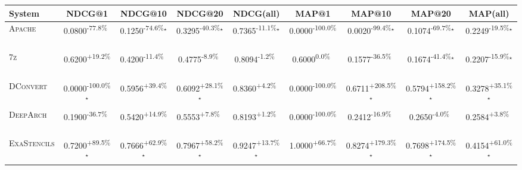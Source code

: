 \begin{table}[htbp]
\centering
\renewcommand{\arraystretch}{1.2}
\begin{tabular}{l|cccc|cccc}
\hline
System & NDCG@1 & NDCG@10 & NDCG@20 & NDCG(all) & MAP@1 & MAP@10 & MAP@20 & MAP(all) \\ \hline
\textsc{Apache} & \cellcolor{red!30}0.0800\textsuperscript{-77.8\%}$^{\,\,\,}$ & \cellcolor{red!30}0.1250\textsuperscript{-74.6\%}$^\star$ & \cellcolor{red!30}0.3295\textsuperscript{-40.3\%}$^\star$ & \cellcolor{red!30}0.7365\textsuperscript{-11.1\%}$^\star$ & \cellcolor{red!30}0.0000\textsuperscript{-100.0\%}$^{\,\,\,}$ & \cellcolor{red!30}0.0020\textsuperscript{-99.4\%}$^\star$ & \cellcolor{red!30}0.1074\textsuperscript{-69.7\%}$^\star$ & \cellcolor{red!30}0.2249\textsuperscript{-19.5\%}$^\star$ \\
\textsc{7z} & \cellcolor{green!30}0.6200\textsuperscript{+19.2\%}$^{\,\,\,}$ & \cellcolor{red!30}0.4200\textsuperscript{-11.4\%}$^{\,\,\,}$ & \cellcolor{red!30}0.4775\textsuperscript{-8.9\%}$^{\,\,\,}$ & \cellcolor{red!30}0.8094\textsuperscript{-1.2\%}$^{\,\,\,}$ & \cellcolor{red!30}0.6000\textsuperscript{0.0\%}$^{\,\,\,}$ & \cellcolor{red!30}0.1577\textsuperscript{-36.5\%}$^{\,\,\,}$ & \cellcolor{red!30}0.1674\textsuperscript{-41.4\%}$^\star$ & \cellcolor{red!30}0.2207\textsuperscript{-15.9\%}$^\star$ \\
\textsc{DConvert} & \cellcolor{red!30}0.0000\textsuperscript{-100.0\%}$^\star$ & \cellcolor{green!30}0.5956\textsuperscript{+39.4\%}$^{\,\,\,}$ & \cellcolor{green!30}0.6092\textsuperscript{+28.1\%}$^\star$ & \cellcolor{green!30}0.8360\textsuperscript{+4.2\%}$^{\,\,\,}$ & \cellcolor{red!30}0.0000\textsuperscript{-100.0\%}$^{\,\,\,}$ & \cellcolor{green!30}0.6711\textsuperscript{+208.5\%}$^\star$ & \cellcolor{green!30}0.5794\textsuperscript{+158.2\%}$^\star$ & \cellcolor{green!30}0.3278\textsuperscript{+35.1\%}$^\star$ \\
\textsc{DeepArch} & \cellcolor{red!30}0.1900\textsuperscript{-36.7\%}$^{\,\,\,}$ & \cellcolor{green!30}0.5420\textsuperscript{+14.9\%}$^{\,\,\,}$ & \cellcolor{green!30}0.5553\textsuperscript{+7.8\%}$^{\,\,\,}$ & \cellcolor{green!30}0.8193\textsuperscript{+1.2\%}$^{\,\,\,}$ & \cellcolor{red!30}0.0000\textsuperscript{-100.0\%}$^{\,\,\,}$ & \cellcolor{red!30}0.2412\textsuperscript{-16.9\%}$^{\,\,\,}$ & \cellcolor{red!30}0.2650\textsuperscript{-4.0\%}$^{\,\,\,}$ & \cellcolor{green!30}0.2584\textsuperscript{+3.8\%}$^{\,\,\,}$ \\
\textsc{ExaStencils} & \cellcolor{green!30}0.7200\textsuperscript{+89.5\%}$^\star$ & \cellcolor{green!30}0.7666\textsuperscript{+62.9\%}$^\star$ & \cellcolor{green!30}0.7967\textsuperscript{+58.2\%}$^\star$ & \cellcolor{green!30}0.9247\textsuperscript{+13.7\%}$^\star$ & \cellcolor{green!30}1.0000\textsuperscript{+66.7\%}$^{\,\,\,}$ & \cellcolor{green!30}0.8274\textsuperscript{+179.3\%}$^\star$ & \cellcolor{green!30}0.7698\textsuperscript{+174.5\%}$^\star$ & \cellcolor{green!30}0.4154\textsuperscript{+61.0\%}$^\star$ \\

\end{tabular}
\end{table}
